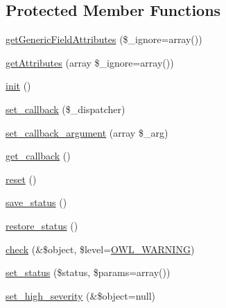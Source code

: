 \subsection*{Protected Member Functions}
\begin{DoxyCompactItemize}
\item 
\hyperlink{classFormFieldPlugin_a8a2959e90a3a20d0bb1bcbfafafc70b0}{getGenericFieldAttributes} (\$\_\-ignore=array())
\item 
\hyperlink{classBaseElement_a5cb9a5224e12b4d7017531ee5e2c9778}{getAttributes} (array \$\_\-ignore=array())
\item 
\hyperlink{class__OWL_ae0ef3ded56e8a6b34b6461e5a721cd3e}{init} ()
\item 
\hyperlink{class__OWL_a28d9025eaf37b49d63cb334ed28c33f0}{set\_\-callback} (\$\_\-dispatcher)
\item 
\hyperlink{class__OWL_a1e26611ce858b237f5a98a91ea3c3a1b}{set\_\-callback\_\-argument} (array \$\_\-arg)
\item 
\hyperlink{class__OWL_abded13b1c97ea6e0cfe3c68cb6bcf7a5}{get\_\-callback} ()
\item 
\hyperlink{class__OWL_a2f2a042bcf31965194c03033df0edc9b}{reset} ()
\item 
\hyperlink{class__OWL_a9e49b9c76fbc021b244c6915ea536d71}{save\_\-status} ()
\item 
\hyperlink{class__OWL_a465eeaf40edd9f9c848841700c32ce55}{restore\_\-status} ()
\item 
\hyperlink{class__OWL_ae2e3c56e5f3c4ce4156c6b1bb1c50f63}{check} (\&\$object, \$level=\hyperlink{owl_8severitycodes_8php_ace886152e2e86cd2e91cb833fd495adb}{OWL\_\-WARNING})
\item 
\hyperlink{class__OWL_aea912d0ede9b3c2a69b79072d94d4787}{set\_\-status} (\$status, \$params=array())
\item 
\hyperlink{class__OWL_a576829692a3b66e3d518853bf43abae3}{set\_\-high\_\-severity} (\&\$object=null)
\end{DoxyCompactItemize}
